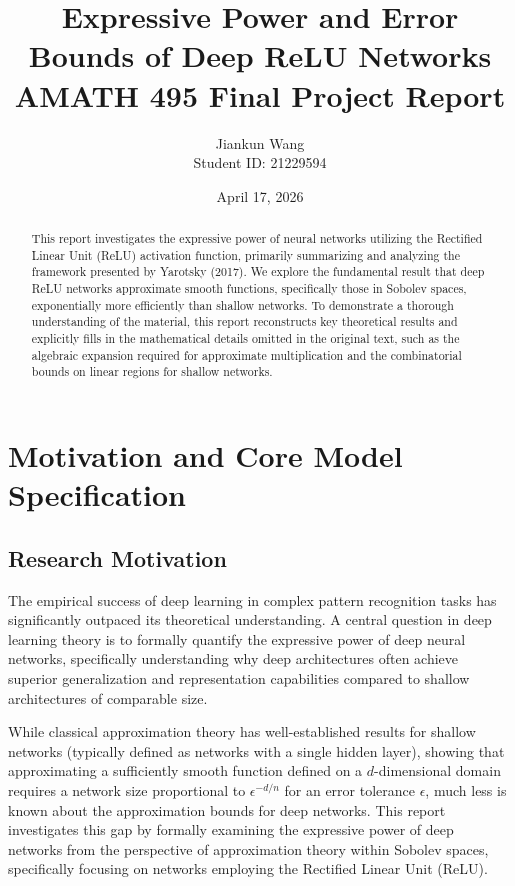 \documentclass[12pt]{article}
\title{\textbf{Expressive Power and Error Bounds of Deep ReLU Networks}\\
\large AMATH 495 Final Project Report}
\author{Jiankun Wang \\ Student ID: 21229594}
\date{April 17, 2026}
\begin{document}
\maketitle

\begin{abstract}
This report investigates the expressive power of neural networks utilizing the Rectified Linear Unit (ReLU) activation function, primarily summarizing and analyzing the framework presented by Yarotsky (2017). We explore the fundamental result that deep ReLU networks approximate smooth functions, specifically those in Sobolev spaces, exponentially more efficiently than shallow networks. To demonstrate a thorough understanding of the material, this report reconstructs key theoretical results and explicitly fills in the mathematical details omitted in the original text, such as the algebraic expansion required for approximate multiplication and the combinatorial bounds on linear regions for shallow networks.
\end{abstract}

\section{Motivation and Core Model Specification}

\subsection{Research Motivation}
The empirical success of deep learning in complex pattern recognition tasks has significantly outpaced its theoretical understanding. A central question in deep learning theory is to formally quantify the expressive power of deep neural networks, specifically understanding why deep architectures often achieve superior generalization and representation capabilities compared to shallow architectures of comparable size. 

While classical approximation theory has well-established results for shallow networks (typically defined as networks with a single hidden layer), showing that approximating a sufficiently smooth function defined on a $d$-dimensional domain requires a network size proportional to $\epsilon^{-d/n}$ for an error tolerance $\epsilon$, much less is known about the approximation bounds for deep networks. This report investigates this gap by formally examining the expressive power of deep networks from the perspective of approximation theory within Sobolev spaces, specifically focusing on networks employing the Rectified Linear Unit (ReLU).
\end{document}
